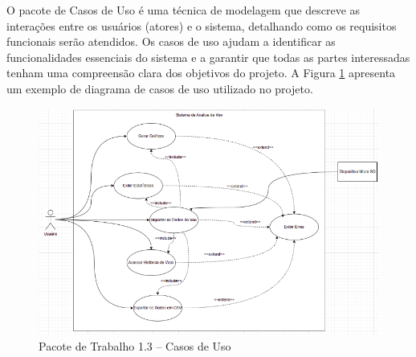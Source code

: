 \begin{samepage}

O pacote de Casos de Uso é uma técnica de modelagem que descreve as interações entre os usuários (atores) e o sistema, detalhando como os requisitos funcionais serão atendidos. Os casos de uso ajudam a identificar as funcionalidades essenciais do sistema e a garantir que todas as partes interessadas tenham uma compreensão clara dos objetivos do projeto. A Figura \ref{fig_casos_de_uso} apresenta um exemplo de diagrama de casos de uso utilizado no projeto.
\begin{figure}[!h]
	\centering
	\includegraphics[width=15cm]{figuras/caso_de_uso.png}
	\caption{Pacote de Trabalho 1.3 – Casos de Uso}
	\label{fig_casos_de_uso}
\end{figure}
\end{samepage}


